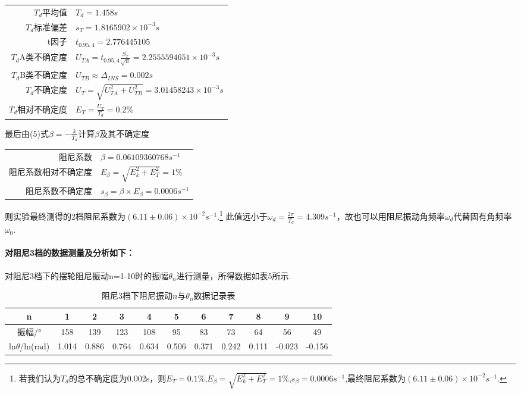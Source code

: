 \documentclass[UTF8]{ctexart}
\begin{document}
\begin{center}\begin{tabular}{r l}
{$T_{d}$平均值}& {$T_{d}=1.458s$}\\
{$T_{d}$标准偏差}& {$s_T=1.8165902\times 10^{-3}s$}\\
{t因子}& {$t_{0.95,4}=2.776445105$}\\
{$T_{d}$A类不确定度}& {$U_{TA}=t_{0.95,4}\frac{S_T}{\sqrt{n}}=2.2555594651\times 10^{-3}s$}\\
{$T_{d}$B类不确定度}& {$U_{TB}\approx \Delta_{INS}=0.002s$}\\
{$T_{d}$不确定度}&{$U_T=\sqrt{U_{TA}^2+U_{TB}^2}=3.01458243\times 10^{-3}s$}\\
{$T_{d}$相对不确定度}&{$E_T=\frac{U_T}{T_{d}}=0.2\%$}
\end{tabular}\end{center}
最后由(5)式$\beta=-\frac{k}{T_{d}}$计算$\beta$及其不确定度
\begin{center}\begin{tabular}{r l}
{阻尼系数}& {$\beta=0.06109360768s^{-1}$}\\
{阻尼系数相对不确定度}&{$E_{\beta}=\sqrt{E_k^2+E_T^2}=1\%$}\\
{阻尼系数不确定度}&{$s_{\beta}=\beta\times E_{\beta}=0.0006s^{-1}$}
\end{tabular}\end{center}
则实验最终测得的2档阻尼系数为$(6.11\pm0.06)\times10^{-2}s^{-1}$.\footnote{ 若我们认为$T_d$的总不确定度为0.002s，则$E_T=0.1\%$,$E_{\beta}=\sqrt{E_k^2+E_T^2}=1\%$,$s_{\beta}=0.0006s^{-1}$,最终阻尼系数为$(6.11\pm0.06)\times10^{-2}s^{-1}$.}
此值远小于$\omega_d=\frac{2\pi}{T_d}=4.309s^{-1}$，故也可以用阻尼振动角频率$\omega_d$代替固有角频率$\omega_0$.


\paragraph{对阻尼3档的数据测量及分析如下：}\quad \par
对阻尼3档下的摆轮阻尼振动n=1-10时的振幅$\theta_n$进行测量，所得数据如表5所示. 
\begin{table}[ht]
{
\centering
\caption{阻尼3档下阻尼振动$n$与$\theta_n$数据记录表}\hspace{15mm}
\begin{tabular}{|c|c|c|c|c|c|c|c|c|c|c|}
\hline
n&1&2&3&4&5&6&7&8&9&10\\
\hline
振幅/°&158&139&123&108&95&83&73&64&56&49\\ 
\hline
ln$\theta$/ln(rad)&1.014&0.886&0.764&0.634&0.506&0.371&0.242&0.111&-0.023&-0.156\\
\hline
\end{tabular}}%
\end{table}
\end{document}
